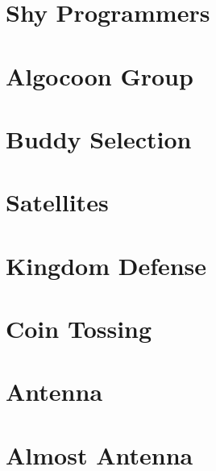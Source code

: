 \documentclass[a4paper, 10pt]{article}
\let\stdsection\section
\renewcommand\section{\newpage\stdsection}
\newcommand{\includecode}[1]{
    }
\newcommand{\algoAuthor}{2} %
\begin{document}
    \section{Shy Programmers}
        \label{sec:shy_programmers}
        \includecode{../problems/w04/Shy_Programmers/ShyProgrammers\algoAuthor.cpp}

    
    \section{Algocoon Group}
        \label{sec:algocoon}
        \includecode{../problems/w05/Algocoon/Algocoon\algoAuthor.cpp}
        
    \section{Buddy Selection}
        \label{sec:buddy_selection}
        \includecode{../problems/w05/Buddies/Buddies\algoAuthor.cpp}
        
    \section{Satellites}
        \label{sec:satellites}
        \includecode{../problems/w05/Satellites/Satellites\algoAuthor.cpp}
        
    \section{Kingdom Defense}
        \label{sec:kingdom_defense}
        \includecode{../problems/w05/Kingdom_Defense/KingdomDefense\algoAuthor.cpp}
    
    \section{Coin Tossing}
        \label{sec:coin_tossing}
        \includecode{../problems/w05/Coin_Tossing/CoinTossing\algoAuthor.cpp}
          

    \section{Antenna}
        \label{sec:antenna}
        \includecode{../problems/w06/Antenna/Antenna\algoAuthor.cpp}
        
    \section{Almost Antenna}
        \label{sec:almost_antenna}
        \includecode{../problems/w06/AlmostAntenna/AlmostAntenna\algoAuthor.cpp}
        
\end{document}
